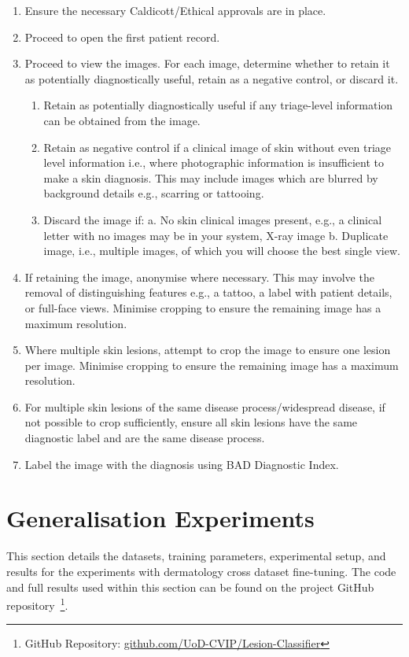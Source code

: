\begin{enumerate}
	\item Ensure the necessary Caldicott/Ethical approvals are in place. 
	\item Proceed to open the first patient record.
	\item Proceed to view the images. For each image, determine whether to retain it as potentially diagnostically useful, retain as a negative control, or discard it.
	\begin{enumerate}
		\item Retain as potentially diagnostically useful if any triage-level information can be obtained from the image.
		\item Retain as negative control if a clinical image of skin without even triage level information i.e., where photographic information is insufficient to make a skin diagnosis. This may include images which are blurred by background details e.g., scarring or tattooing.
		\item Discard the image if: a. No skin clinical images present, e.g., a clinical letter with no images may be in your system, X-ray image b. Duplicate image, i.e., multiple images, of which you will choose the best single view.
	\end{enumerate}
	\item If retaining the image, anonymise where necessary. This may involve the removal of distinguishing features e.g., a tattoo, a label with patient details, or full-face views. Minimise cropping to ensure the remaining image has a maximum resolution. 
	\item Where multiple skin lesions, attempt to crop the image to ensure one lesion per image. Minimise cropping to ensure the remaining image has a maximum resolution.
	\item For multiple skin lesions of the same disease process/widespread disease, if not possible to crop sufficiently, ensure all skin lesions have the same diagnostic label and are the same disease process.
	\item Label the image with the diagnosis using BAD Diagnostic Index.
\end{enumerate}



\section{Generalisation Experiments}
\label{sec:generalisation_experiments}
This section details the datasets, training parameters, experimental setup, and results for the experiments with dermatology cross dataset fine-tuning. The code and full results used within this section can be found on the project GitHub repository~\footnote{GitHub Repository: \url{github.com/UoD-CVIP/Lesion-Classifier}}.

